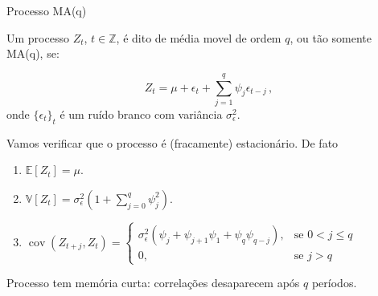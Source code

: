 \documentclass[11pt]{beamer}
\newenvironment{halfwideitemize}{\itemize\addtolength{\itemsep}{0.5em}}{\enditemize}
\begin{document}
\begin{frame}{Processo  MA(q)}
	\begin{halfwideitemize}
			\item Um processo $Z_t$, $t \in \mathbb{Z}$, é dito de média movel de ordem $q$, ou tão somente MA(q), se:
			
			$$Z_t = \mu + \epsilon_t + \sum_{j=1}^{q} \psi_j \epsilon_{t-j} \, ,$$
			onde $\{\epsilon_t\}_t$ é um ruído branco com variância $\sigma^2_\epsilon$.
			\item Vamos verificar que o processo é (fracamente) estacionário. De fato
			\begin{enumerate}
				\item 			$\mathbb{E}[Z_t] = \mu $.
				\item $\mathbb{V}[Z_t] = \sigma^2_\epsilon(1+ \sum_{j=0}^q\psi^2_j)$.
				\item $\operatorname{cov}( Z_{t+j}, Z_t) = \begin{cases}
					\sigma^2_\epsilon (\psi_{j} + \psi_{j+1}\psi_1 + \psi_q \psi_{q-j}), & \text{se } 0 < j  \leq q \\
					0,& \text{se } j  > q
				\end{cases}$
			\end{enumerate}
			\item Processo tem memória curta: correlações desaparecem após $q$ períodos.
	\end{halfwideitemize}
\end{frame}
\end{document}

